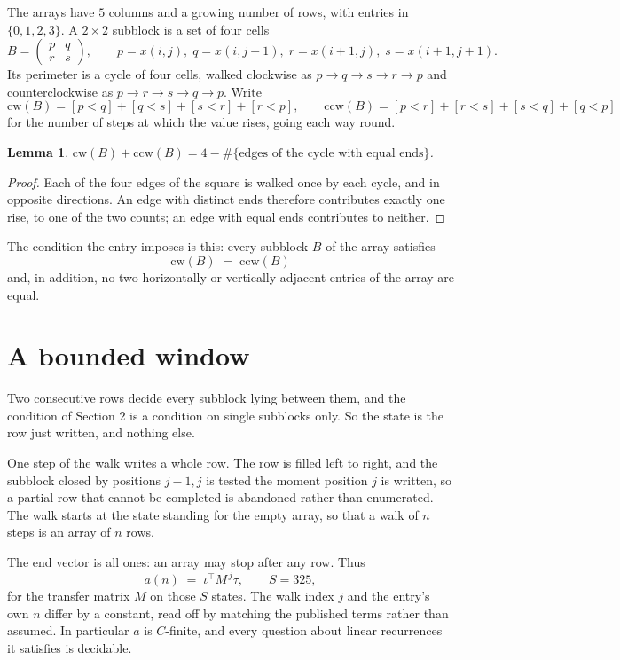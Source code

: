 \documentclass[11pt,a4paper]{article}
\theoremstyle{plain}
\newtheorem{lemma}[theorem]{Lemma}
\theoremstyle{definition}
\begin{document}
The arrays have $5$ columns and a growing number of rows, with entries in $\{0,1,2,3\}$. A
$2\times2$ subblock is a set of four cells
\[
B=\begin{pmatrix} p & q \\ r & s \end{pmatrix},
\qquad p=x(i,j),\; q=x(i,j+1),\; r=x(i+1,j),\; s=x(i+1,j+1).
\]
Its perimeter is a cycle of four cells, walked clockwise as $p\to q\to s\to r\to p$ and
counterclockwise as $p\to r\to s\to q\to p$. Write
\[
\mathrm{cw}(B)=[p<q]+[q<s]+[s<r]+[r<p],\qquad
\mathrm{ccw}(B)=[p<r]+[r<s]+[s<q]+[q<p]
\]
for the number of steps at which the value rises, going each way round.

\begin{lemma}\label{lem:sum}
$\mathrm{cw}(B)+\mathrm{ccw}(B)=4-\#\{\text{edges of the cycle with equal ends}\}$.
\end{lemma}

\begin{proof}
Each of the four edges of the square is walked once by each cycle, and in opposite directions.
An edge with distinct ends therefore contributes exactly one rise, to one of the two counts;
an edge with equal ends contributes to neither.
\end{proof}

The condition the entry imposes is this: every subblock $B$ of the array satisfies
\[
\mathrm{cw}(B)\;=\;\mathrm{ccw}(B)
\]
and, in addition, no two horizontally or vertically adjacent entries of the array are equal.

\section{A bounded window}

Two consecutive rows decide every subblock lying between them, and the condition of Section 2 is a condition on single subblocks only. So the state is the row just written, and nothing else.

One step of the walk writes a whole row. The row is filled left to right, and the subblock
closed by positions $j-1,j$ is tested the moment position $j$ is written, so a partial row that
cannot be completed is abandoned rather than enumerated. The walk starts at the state standing
for the empty array, so that a walk of $n$ steps is an array of $n$ rows.

The end vector is all ones: an array may stop after any row. Thus
\[
a(n)\;=\;\iota^{\!\top}M^{\,j}\tau ,\qquad S=325,
\]
for the transfer matrix $M$ on those $S$ states. The walk index $j$ and the entry's own $n$
differ by a constant, read off by matching the published terms rather than assumed. In
particular $a$ is $C$-finite, and every question about linear recurrences it satisfies is
decidable.
\end{document}
